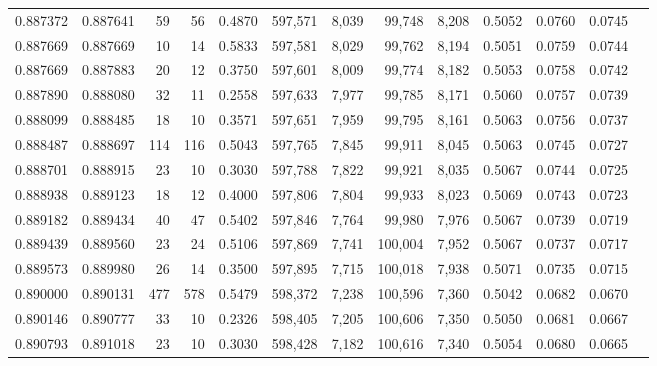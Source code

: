 \begin{tabular}{rrrrrrrrrrrrr}
0.887372 & 0.887641 &    59 &  56 &                                     0.4870 & 597,571 &   8,039 &  99,748 &   8,208 & 0.5052 & 0.0760 & 0.0745 \\
0.887669 & 0.887669 &    10 &  14 &                                     0.5833 & 597,581 &   8,029 &  99,762 &   8,194 & 0.5051 & 0.0759 & 0.0744 \\
0.887669 & 0.887883 &    20 &  12 &                                     0.3750 & 597,601 &   8,009 &  99,774 &   8,182 & 0.5053 & 0.0758 & 0.0742 \\
0.887890 & 0.888080 &    32 &  11 &                                     0.2558 & 597,633 &   7,977 &  99,785 &   8,171 & 0.5060 & 0.0757 & 0.0739 \\
0.888099 & 0.888485 &    18 &  10 &                                     0.3571 & 597,651 &   7,959 &  99,795 &   8,161 & 0.5063 & 0.0756 & 0.0737 \\
0.888487 & 0.888697 &   114 & 116 &                                     0.5043 & 597,765 &   7,845 &  99,911 &   8,045 & 0.5063 & 0.0745 & 0.0727 \\
0.888701 & 0.888915 &    23 &  10 &                                     0.3030 & 597,788 &   7,822 &  99,921 &   8,035 & 0.5067 & 0.0744 & 0.0725 \\
0.888938 & 0.889123 &    18 &  12 &                                     0.4000 & 597,806 &   7,804 &  99,933 &   8,023 & 0.5069 & 0.0743 & 0.0723 \\
0.889182 & 0.889434 &    40 &  47 &                                     0.5402 & 597,846 &   7,764 &  99,980 &   7,976 & 0.5067 & 0.0739 & 0.0719 \\
0.889439 & 0.889560 &    23 &  24 &                                     0.5106 & 597,869 &   7,741 & 100,004 &   7,952 & 0.5067 & 0.0737 & 0.0717 \\
0.889573 & 0.889980 &    26 &  14 &                                     0.3500 & 597,895 &   7,715 & 100,018 &   7,938 & 0.5071 & 0.0735 & 0.0715 \\
0.890000 & 0.890131 &   477 & 578 &                                     0.5479 & 598,372 &   7,238 & 100,596 &   7,360 & 0.5042 & 0.0682 & 0.0670 \\
0.890146 & 0.890777 &    33 &  10 &                                     0.2326 & 598,405 &   7,205 & 100,606 &   7,350 & 0.5050 & 0.0681 & 0.0667 \\
0.890793 & 0.891018 &    23 &  10 &                                     0.3030 & 598,428 &   7,182 & 100,616 &   7,340 & 0.5054 & 0.0680 & 0.0665 \\

\end{tabular}
